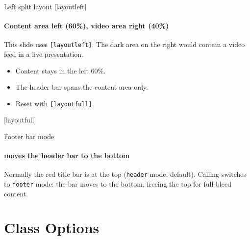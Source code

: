 \documentclass[sans,numeric,titlesplit]{qslides}
\begin{document}
\begin{frame}{Left split layout}
  [layoutleft]
  \framesubtitle{Content area left (60\%), video area right (40\%)}
  This slide uses \texttt{[layoutleft]}.
  The dark area on the right would contain
  a video feed in a live presentation.
  \begin{itemize}
    \item Content stays in the left 60\%.
    \item The header bar spans the content area only.
    \item Reset with \texttt{[layoutfull]}.
  \end{itemize}
\end{frame}

[layoutfull]

\begin{frame}{Footer bar mode}
  \framesubtitle{\texttt{\string\enablefooter} moves the header bar to the bottom}
  Normally the red title bar is at the top (\texttt{header} mode, default).
  Calling \texttt{\string\enablefooter} switches to \texttt{footer} mode:
  the bar moves to the bottom, freeing the top for full-bleed content.
\end{frame}

\section{Class Options}
\end{document}
